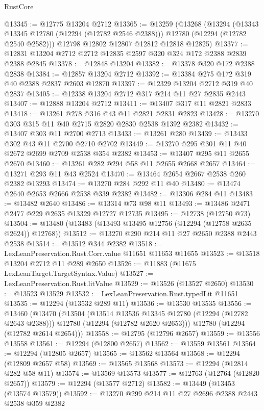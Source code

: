\begin{lexlean}{RustCore}
\begin{coremodule}
@13345 := @12775 @13204 @2712
@13365 := @13259
    (@13268
      (@13294
        (@13343 @13345 @12780 (@12294 (@12782 @2546 @2388)))
        @12780
        (@12294 (@12782 @2540 @2582)))
      @12798
      @12802
      @12807
      @12812
      @12818
      @12825)
@13377 := @12831 @13204 @2712 @2712 @12835 @2597 @320 @324 @172 @2388 @2839 @2388 @2845
@13378 := @12848 @13204
@13382 := @13378 @320 @172 @2388 @2838
@13384 := @12857 @13204 @2712
@13392 := @13384 @275 @172 @319 @40 @2388 @2837 @2603 @12870
@13397 := @12329 @13204 @2712 @319 @40 @2837
@13405 := @12338 @13204 @2712 @317 @214 @11 @27 @2835 @2443
@13407 := @12888 @13204 @2712
@13411 := @13407 @317 @11 @2821 @2833
@13418 := @13261 @278 @316 @43 @11 @2821 @2831 @2823
@13428 := @13270 @303 @315 @11 @40 @2715 @2820 @2830 @2538 @1392 @2382
@13432 := @13407 @303 @11 @2700 @2713
@13433 := @13261 @280
@13439 := @13433 @302 @43 @11 @2700 @2710 @2702
@13449 := @13270 @295 @301 @11 @40 @2672 @2699 @2709 @2538 @354 @2382
@13453 := @13407 @295 @11 @2655 @2670
@13460 := @13261 @282 @294 @58 @11 @2655 @2668 @2657
@13464 := @13271 @293 @11 @43 @2524
@13470 := @13464 @2654 @2667 @2538 @260 @2382 @13293
@13474 := @13270 @284 @292 @11 @40
@13480 := @13474 @2640 @2653 @2666 @2538 @339 @2382
@13482 := @13306 @284 @11
@13483 := @13482 @2640
@13486 := @13314 @73 @98 @11
@13493 := @13486 @2471 @2477 @229 @2635 @13329 @12727 @12735
@13495 := @12738 (@12750 @73)
@13504 := @13480 (@13483 (@13493 @13495 @12756 (@12294 (@12758 @2635 @2624)) @12768))
@13512 := @13270 @290 @214 @11 @27 @2650 @2388 @2443 @2538
@13514 := @13512 @344 @2382
@13518 := LexLeanPreservation.Rust.Corr.value @11651 @11653 @11655
@13523 := @13518 @13204 @2712 @11 @289 @2650
@13526 := @11883 (@11675 LexLeanTarget.TargetSyntax.Value)
@13527 := LexLeanPreservation.Rust.litValue
@13529 := @13526 (@13527 @2650)
@13530 := @13523 @13529
@13532 := LexLeanPreservation.Rust.typedLit @11651
@13535 := @12294 (@13532 @289 @11)
@13536 := @13530 @13535
@13556 := @13460
    (@13470
      (@13504
        (@13514 @13536 @13345 @12780 (@12294 (@12782 @2643 @2388)))
        @12780
        (@12294 (@12782 @2620 @2653)))
      @12780
      (@12294 (@12782 @2614 @2654)))
@13558 := @12795 (@12796 @2657)
@13559 := @13556 @13558
@13561 := @12294 (@12800 @2657)
@13562 := @13559 @13561
@13564 := @12294 (@12805 @2657)
@13565 := @13562 @13564
@13568 := @12294 (@12809 @2657 @58)
@13569 := @13565 @13568
@13573 := @12294 (@12814 @282 @58 @11)
@13574 := @13569 @13573
@13577 := @12763 (@12764 (@12820 @2657))
@13579 := @12294 (@13577 @2712)
@13582 := @13449 (@13453 (@13574 @13579))
@13592 := @13270 @299 @214 @11 @27 @2696 @2388 @2443 @2538 @359 @2382

\end{coremodule}
\end{lexlean}
